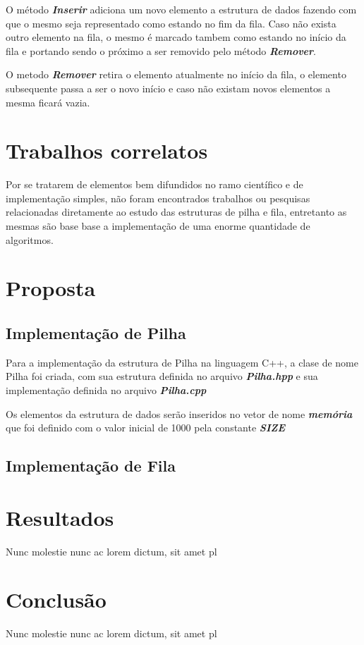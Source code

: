 \documentclass[rascunho,xindy,sublist]{fei}
\begin{document}
O método \textbf{\textit{Inserir}} adiciona um novo elemento a estrutura de dados fazendo com que o mesmo seja representado como estando no fim da fila. Caso não exista outro elemento na fila, o mesmo é marcado tambem como estando no início da fila e portando sendo o próximo a ser removido pelo método  \textbf{\textit{Remover}}. 

O metodo \textbf{\textit{Remover}} retira o elemento atualmente no início da fila, o elemento subsequente passa a ser o novo início e caso não existam novos elementos a mesma ficará vazia.

\chapter{Trabalhos correlatos}

Por se tratarem de elementos bem difundidos no ramo científico e de implementação simples, não foram encontrados trabalhos ou pesquisas relacionadas diretamente ao estudo das estruturas de pilha e fila, entretanto as mesmas são base base a implementação de uma enorme quantidade de algoritmos.

\chapter{Proposta}

\section{Implementação de Pilha}

Para a implementação da estrutura de Pilha na linguagem C++, a clase de nome Pilha foi criada, com sua estrutura definida no arquivo \textbf{\textit{Pilha.hpp}} e sua implementação definida no arquivo \textbf{\textit{Pilha.cpp}}

Os elementos da estrutura de dados serão inseridos no vetor de nome  \textbf{\textit{memória}} que foi definido com o valor inicial de 1000 pela constante \textbf{\textit{SIZE}} 



\section{Implementação de Fila}

\chapter{Resultados}

Nunc molestie nunc ac lorem dictum, sit amet pl

\chapter{Conclusão}

Nunc molestie nunc ac lorem dictum, sit amet pl

\printbibliography

\printindex
\end{document}
